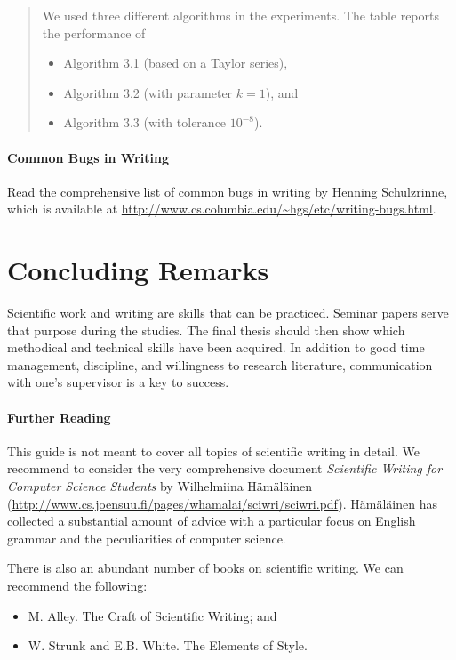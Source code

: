 \begin{quote}
  We used three different algorithms in the experiments. The table reports the performance of
\begin{itemize}
\item Algorithm 3.1 (based on a Taylor series),
\item Algorithm 3.2 (with parameter \(k = 1\)), and
\item Algorithm 3.3 (with tolerance \(10^{-8}\)).
\end{itemize}
\end{quote}

\paragraph{Common Bugs in Writing}
\label{par:commonbugs}
Read the comprehensive list of common bugs in writing by Henning Schulzrinne, which is available at \url{http://www.cs.columbia.edu/~hgs/etc/writing-bugs.html}.

\section{Concluding Remarks}

Scientific work and writing are skills that can be practiced. Seminar papers serve that purpose during the studies. The final thesis should then show which methodical and technical skills have been acquired. In addition to good time management, discipline, and willingness to research literature, communication with one's supervisor is a key to success.

\paragraph{Further Reading}

This guide is not meant to cover all topics of scientific writing in detail. We recommend to consider the very comprehensive document \emph{Scientific Writing for Computer Science Students} by Wilhelmiina Hämäläinen (\url{http://www.cs.joensuu.fi/pages/whamalai/sciwri/sciwri.pdf}). Hämäläinen has collected a substantial amount of advice with a particular focus on English grammar and the peculiarities of computer science.

There is also an abundant number of books on scientific writing. We can recommend the following:
\begin{itemize}
\item M. Alley. The Craft of Scientific Writing; and
\item W. Strunk and E.B. White. The Elements of Style.
\end{itemize}

